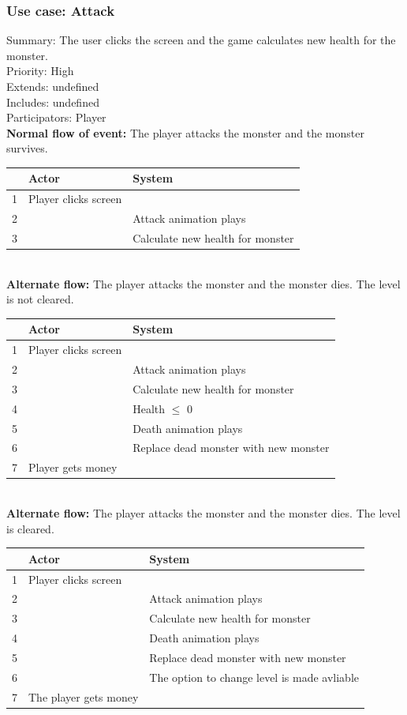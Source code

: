 \documentclass{article}
\begin{document}
\subsubsection{Use case: Attack}
Summary: The user clicks the screen and the game calculates new health for the monster.\\
Priority: High\\
Extends: undefined\\
Includes: undefined\\
Participators: Player\\
\textbf{Normal flow of event:} The player attacks the monster and the monster survives.
\vspace
\begin{tabular}{| c | l | l |} \hline
    & Actor & System \\ \hline
    1 & Player clicks screen & \\ \hline
    2 & & Attack animation plays \\ \hline
    3 & & Calculate new health for monster\\ \hline
\end{tabular}\\
\newpage
\noindent
\textbf{Alternate flow:} The player attacks the monster and the monster dies. The level is not cleared.\\
\vspace
\begin{tabular}{| c | l | l |} \hline
    & Actor & System \\ \hline
    1 & Player clicks screen & \\ \hline
    2 & & Attack animation plays \\ \hline
    3 & & Calculate new health for monster\\ \hline
    4 & & Health $\le$ 0 \\ \hline
    5 & & Death animation plays \\ \hline 
    6 & & Replace dead monster with new monster \\ \hline
    7 & Player gets money & \\ \hline
\end{tabular}\\
\textbf{Alternate flow:} The player attacks the monster and the monster dies. The level is cleared.\\
\begin{tabular}{| c | l | l |} \hline
    & Actor & System \\ \hline
    1 & Player clicks screen & \\ \hline
    2 & & Attack animation plays \\ \hline
    3 & & Calculate new health for monster\\ \hline
    4 & & Death animation plays \\ \hline 
    5 & & Replace dead monster with new monster \\ \hline
    6 & & The option to change level is made avliable\\ \hline
    7 & The player gets money & \\ \hline
\end{tabular}
\end{document}
